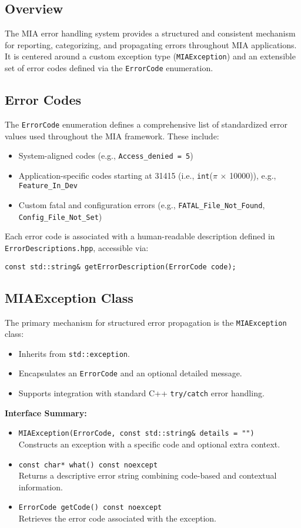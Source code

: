 \subsection*{Overview}
The MIA error handling system provides a structured and consistent mechanism for reporting, categorizing, and propagating errors throughout MIA applications. It is centered around a custom exception type (\texttt{MIAException}) and an extensible set of error codes defined via the \texttt{ErrorCode} enumeration.

\subsection*{Error Codes}
The \texttt{ErrorCode} enumeration defines a comprehensive list of standardized error values used throughout the MIA framework. These include:
\begin{itemize}
	\item System-aligned codes (e.g., \texttt{Access\_denied = 5})
	\item Application-specific codes starting at 31415 (i.e., \texttt{int}($\pi$ × 10000)), e.g., \texttt{Feature\_In\_Dev}
	\item Custom fatal and configuration errors (e.g., \texttt{FATAL\_File\_Not\_Found}, \texttt{Config\_File\_Not\_Set})
\end{itemize}

Each error code is associated with a human-readable description defined in \texttt{ErrorDescriptions.hpp}, accessible via:
\begin{lstlisting}[style=cppstyle]
const std::string& getErrorDescription(ErrorCode code);
\end{lstlisting}

\subsection*{MIAException Class}
The primary mechanism for structured error propagation is the \texttt{MIAException} class:
\begin{itemize}
	\item Inherits from \texttt{std::exception}.
	\item Encapsulates an \texttt{ErrorCode} and an optional detailed message.
	\item Supports integration with standard C++ \texttt{try/catch} error handling.
\end{itemize}

\textbf{Interface Summary:}
\begin{itemize}
	\item \texttt{MIAException(ErrorCode, const std::string\& details = "")} \\
	Constructs an exception with a specific code and optional extra context.
	\item \texttt{const char* what() const noexcept} \\
	Returns a descriptive error string combining code-based and contextual information.
	\item \texttt{ErrorCode getCode() const noexcept} \\
	Retrieves the error code associated with the exception.
\end{itemize}

